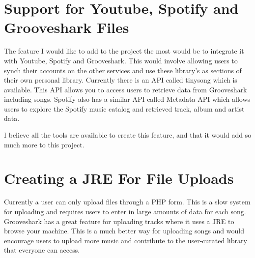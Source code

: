 \documentclass[a4paper, 12pt]{report}
\begin{document}
\section{Support for Youtube, Spotify and Grooveshark Files}
The feature I would like to add to the project the most would be to integrate it with Youtube, Spotify and Grooveshark. This would involve allowing users to synch their accounts on the other services and use these library’s as sections of their own personal library. Currently there is an API called tinysong\cite{tinysong} which is available. This API allows you to access users to retrieve data from Grooveshark including songs. Spotify also has a similar API called Metadata API\cite{spotifyAPI} which allows users to explore the Spotify music catalog and retrieved track, album and artist data.

I believe all the tools are available to create this feature, and that it would add so much more to this project.

\section{Creating a JRE For File Uploads}
Currently a user can only upload files through a PHP form. This is a slow system for uploading and requires users to enter in large amounts of data for each song. Grooveshark has a great feature for uploading tracks where it uses a JRE to browse your machine\cite{jre}. This is a much better way for uploading songs and would encourage users to upload more music and contribute to the user-curated library that everyone can access.
\end{document}
